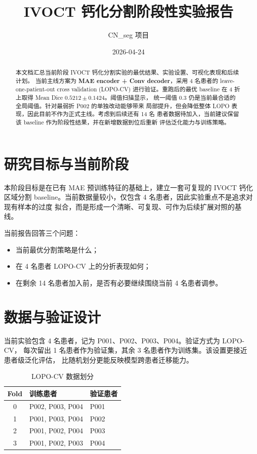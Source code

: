 \documentclass[UTF8,11pt]{ctexart}
\title{IVOCT 钙化分割阶段性实验报告}
\author{CN\_seg 项目}
\date{2026-04-24}
\begin{document}
\maketitle

\begin{abstract}
本文档汇总当前阶段 IVOCT 钙化分割实验的最优结果、实验设置、可视化表现和后续计划。
当前主线方案为 \textbf{MAE encoder + Conv decoder}，采用 4 名患者的
leave-one-patient-out cross validation (LOPO-CV) 进行验证。重跑后的最优
baseline 在 4 折上取得 Mean Dice $0.5212 \pm 0.1424$。阈值扫描显示，
统一阈值 $0.3$ 仍是当前最合适的全局阈值。针对最弱折 P002 的单独改动能够带来
局部提升，但会降低整体 LOPO 表现，因此目前不作为正式主线。考虑到后续还有 14 名
患者数据待加入，当前建议保留该 baseline 作为阶段性结果，并在新增数据到位后重新
评估泛化能力与训练策略。
\end{abstract}

\section{研究目标与当前阶段}

本阶段目标是在已有 MAE 预训练特征的基础上，建立一套可复现的 IVOCT 钙化区域分割
baseline。当前数据量较小，仅包含 4 名患者，因此实验重点不是追求对现有样本的过度
拟合，而是形成一个清晰、可复现、可作为后续扩展对照的基线。

当前报告回答三个问题：

\begin{itemize}
  \item 当前最优分割策略是什么；
  \item 在 4 名患者 LOPO-CV 上的分折表现如何；
  \item 在剩余 14 名患者加入前，是否有必要继续围绕当前 4 名患者调参。
\end{itemize}

\section{数据与验证设计}

当前实验包含 4 名患者，记为 P001、P002、P003、P004。验证方式为 LOPO-CV，
每次留出 1 名患者作为验证集，其余 3 名患者作为训练集。该设置更接近患者级泛化评估，
比随机划分更能反映模型跨患者迁移能力。

\begin{table}[htbp]
\centering
\caption{LOPO-CV 数据划分}
\label{tab:splits}
\begin{tabular}{cll}
\toprule
Fold & 训练患者 & 验证患者 \\
\midrule
0 & P002, P003, P004 & P001 \\
1 & P001, P003, P004 & P002 \\
2 & P001, P002, P004 & P003 \\
3 & P001, P002, P003 & P004 \\
\bottomrule
\end{tabular}
\end{table}
\end{document}
